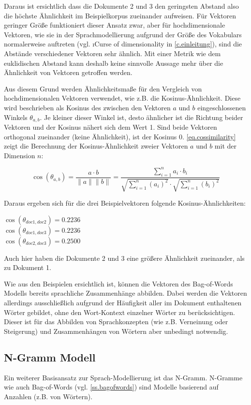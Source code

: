 Daraus ist ersichtlich dass die Dokumente 2 und 3 den geringsten Abstand also die höchste Ähnlichkeit im Beispielkorpus zueinander aufweisen. Für Vektoren geringer Größe funktioniert dieser Ansatz zwar, aber für hochdimensionale Vektoren, wie sie in der Sprachmodellierung aufgrund der Größe des Vokabulars normalerweise auftreten (vgl. \i{Curse of dimensionality} in \autoref{c.einleitung}), sind die Abstände verschiedener Vektoren sehr ähnlich. Mit einer Metrik wie dem euklidischen Abstand kann deshalb keine sinnvolle Aussage mehr über die Ähnlichkeit von Vektoren getroffen werden.

Aus diesem Grund werden Ähnlichkeitsmaße für den Vergleich von hochdimensionalen Vektoren verwendet, wie z.B. die Kosinus-Ähnlichkeit. Diese wird beschrieben als Kosinus des zwischen den Vektoren $a$ und $b$ eingeschlossenen Winkels $\theta_{a,b}$. Je kleiner dieser Winkel ist, desto ähnlicher ist die Richtung beider Vektoren und der Kosinus nähert sich dem Wert 1. Sind beide Vektoren orthogonal zueinander (keine Ähnlichkeit), ist der Kosinus 0. \autoref{eq.cossimilarity} zeigt die Berechnung der Kosinus-Ähnlichkeit zweier Vektoren $a$ und $b$ mit der Dimension $n$:

\begin{equation}
    \cos(\theta_{a,b}) = \frac{a \cdot b}{\|a\|\|b\|} = \frac{\sum^n_{i=1} a_i \cdot b_i}{\sqrt{\sum^n_{i=1} (a_i)^2} \cdot \sqrt{\sum^n_{i=1} (b_i)^2}}  \label{eq.cossimilarity}
\end{equation}

Daraus ergeben sich für die drei Beispielvektoren folgende Kosinus-Ähnlichkeiten:

$\cos(\theta_{doc1,doc2}) = 0.2236$\\
$\cos(\theta_{doc1,doc3}) = 0.2236$\\
$\cos(\theta_{doc2,doc3}) = 0.2500$

Auch hier haben die Dokumente 2 und 3 eine größere Ähnlichkeit zueinander, als zu Dokument 1.

Wie aus den Beispielen ersichtlich ist, können die Vektoren des Bag-of-Words Modells bereits sprachliche Zusammenhänge abbilden. Dabei werden die Vektoren allerdings ausschließlich aufgrund der Häufigkeit aller im Dokument enthaltenen Wörter gebildet, ohne den Wort-Kontext einzelner Wörter zu berücksichtigen. Dieser ist für das Abbilden von Sprachkonzepten (wie z.B. Verneinung oder Steigerung) und Zusammenhängen von Wörtern aber unbedingt notwendig.

\subsection{N-Gramm Modell}\label{ss.ngram}
Ein weiterer Basisansatz zur Sprach-Modellierung ist das N-Gramm. N-Gramme wie auch Bag-of-Words (vgl. \autoref{ss.bagofwords}) sind Modelle basierend auf Anzahlen (z.B. von Wörtern).

